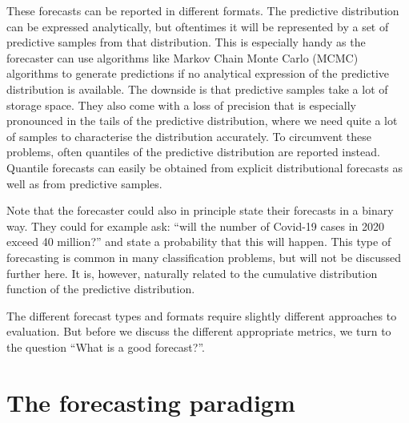 \documentclass[
]{book}
\begin{document}
These forecasts can be reported in different formats. The predictive distribution can be expressed analytically, but oftentimes it will be represented by a set of predictive samples from that distribution. This is especially handy as the forecaster can use algorithms like Markov Chain Monte Carlo (MCMC) algorithms to generate predictions if no analytical expression of the predictive distribution is available. The downside is that predictive samples take a lot of storage space. They also come with a loss of precision that is especially pronounced in the tails of the predictive distribution, where we need quite a lot of samples to characterise the distribution accurately. To circumvent these problems, often quantiles of the predictive distribution are reported instead. Quantile forecasts can easily be obtained from explicit distributional forecasts as well as from predictive samples.

Note that the forecaster could also in principle state their forecasts in a binary way. They could for example ask: ``will the number of Covid-19 cases in 2020 exceed 40 million?'' and state a probability that this will happen. This type of forecasting is common in many classification problems, but will not be discussed further here. It is, however, naturally related to the cumulative distribution function of the predictive distribution.

The different forecast types and formats require slightly different approaches to evaluation. But before we discuss the different appropriate metrics, we turn to the question ``What is a good forecast?''.

\hypertarget{the-forecasting-paradigm}{%
\section{The forecasting paradigm}\label{the-forecasting-paradigm}}
\end{document}

